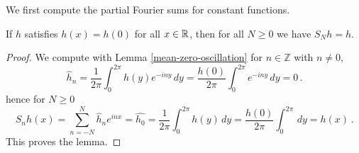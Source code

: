 {We first compute the partial Fourier sums for constant functions.


\begin{lemma}
\label{constant-function}
If $h$ satisfies $h(x)=h(0)$ for all $x\in {\mathbb{R}}$, then for all $N\ge 0$ we have $S_Nh=h$.
 \end{lemma}
\begin{proof}
    We compute with Lemma \ref{mean-zero-oscillation} for $n\in \mathbb{Z}$ with $n\neq 0$,
    \begin{equation}
        \widehat{h}_n=\frac 1{2\pi}\int_0^{2\pi}h(y)e^{-iny}\, dy=\frac {h(0)}{2\pi}\int_0^{2\pi}e^{-iny}\, dy=0\, .
    \end{equation}
hence for $N\ge 0$
\begin{equation}
    S_nh(x)=\sum_{n=-N}^N \widehat{h}_n e^{inx}=\widehat{h_0}=\frac{1}{2\pi}\int_0^{2\pi}h(y)\, dy
    =\frac{h(0)}{2\pi}\int_0^{2\pi}\, dy=h(x)\, .
\end{equation}
This proves the lemma.
\end{proof}

}
